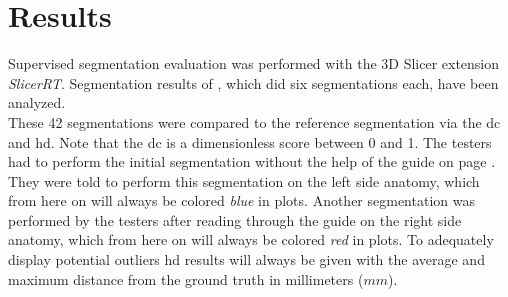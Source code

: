 
\chapter{Results}\label{c:results}
Supervised segmentation evaluation was performed with the 3D Slicer extension \textit{SlicerRT}.
Segmentation results of \noTesters, which did six segmentations each, have been analyzed.\\
These 42 segmentations were compared to the reference segmentation via the \acrlong{dc} and \acrlong{hd}.
Note that the \acrlong{dc} is a dimensionless score between 0 and 1.
The testers had to perform the initial segmentation without the help of the guide on page \pageref{a:guide}.
They were told to perform this segmentation on the left side anatomy,
which from here on will always be colored \textit{blue} in plots.
Another segmentation was performed by the testers after reading through the guide on the right side anatomy,
which from here on will always be colored \textit{red} in plots.
To adequately display potential outliers \acrfull{hd} results will always be given with the average and maximum distance from the ground truth in millimeters ($mm$).


